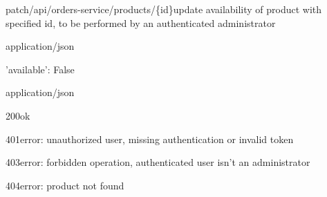 \begin{apiRoute}{patch}{/api/orders-service/products/\{id\}}{update availability of product with specified id, to be performed by an authenticated administrator}
	\begin{routeParameter}
	\end{routeParameter}
	\begin{routeRequest}{application/json}
		\begin{routeRequestBody}
{
    'available': False
}
		\end{routeRequestBody}
	\end{routeRequest}
	\begin{routeResponse}{application/json}
		\begin{routeResponseItem}{200}{ok}
    		\begin{routeResponseItemBody}
        	\end{routeResponseItemBody} 
		\end{routeResponseItem}
		\begin{routeResponseItem}{401}{error: unauthorized user, missing authentication or invalid token}
    	    \begin{routeResponseItemBody}
			\end{routeResponseItemBody}
		\end{routeResponseItem}
		\begin{routeResponseItem}{403}{error: forbidden operation, authenticated user isn't an administrator}
    	    \begin{routeResponseItemBody}
			\end{routeResponseItemBody}
		\end{routeResponseItem}
		\begin{routeResponseItem}{404}{error: product not found}
    		\begin{routeResponseItemBody}
        	\end{routeResponseItemBody} 
		\end{routeResponseItem}
	\end{routeResponse}
\end{apiRoute}

